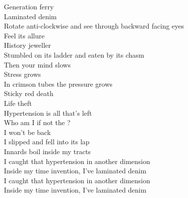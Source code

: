 Generation ferry\\
Laminated denim\\
Rotate anti-clockwise and see through backward facing eyes\\
Feel its allure\\
History jeweller\\
Stumbled on its ladder and eaten by its chasm\\
Then your mind slows\\
Stress grows\\
In crimson tubes the pressure grows\\
Sticky red death\\
Life theft\\
Hypertension is all that's left\\

Who am I if not the ?\\
I won't be back\\
I slipped and fell into its lap\\
Innards boil inside my tracts\\

I caught that hypertension in another dimension\\
Inside my time invention, I've laminated denim\\

I caught that hypertension in another dimension\\
Inside my time invention, I've laminated denim\\
